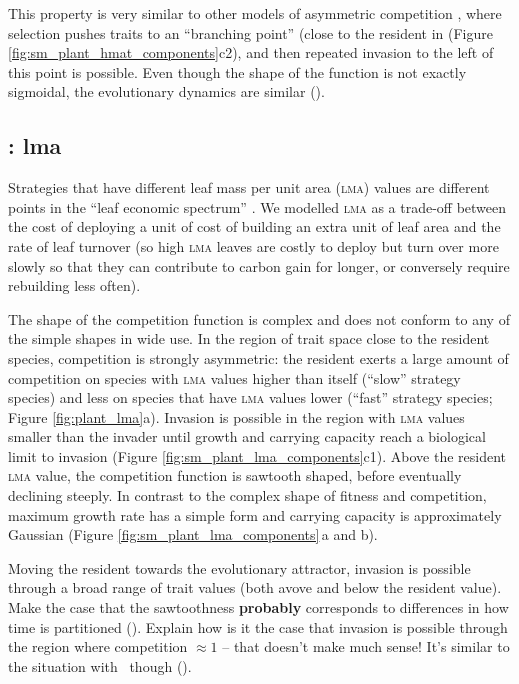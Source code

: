 \documentclass[a4paper,11pt]{article}
\begin{document}
This property is very similar to other models of asymmetric
competition \citep[e.g.,][]{Kisdi-1999}, where selection pushes traits
to an ``branching point'' (close to the resident in (Figure
\ref{fig:sm_plant_hmat_components}c2), and then repeated invasion to
the left of this point is possible.
Even though the shape of the function is not exactly sigmoidal, the
evolutionary dynamics are similar (\TODO).

\subsection{\plant: lma}
Strategies that have different leaf mass per unit area (\textsc{lma})
values are different points in the ``leaf economic spectrum''
\citep{Reich-1997,Wright-2004}.  We modelled \textsc{lma} as a trade-off
between the cost of deploying a unit of cost of building an extra unit
of leaf area and the rate of leaf turnover (so high \textsc{lma} leaves are
costly to deploy but turn over more slowly so that they can contribute
to carbon gain for longer, or conversely require rebuilding less
often).

The shape of the competition function is complex and does not conform
to any of the simple shapes in wide use.
In the region of trait space close to the resident species,
competition is strongly asymmetric: the resident exerts a large amount
of competition on species with \textsc{lma} values higher than itself (``slow''
strategy species) and less on species that have \textsc{lma} values lower
(``fast'' strategy species; Figure \ref{fig:plant_lma}a).  Invasion is
possible in the region with \textsc{lma} values smaller than the invader until
growth and carrying capacity reach a biological limit to invasion
(Figure \ref{fig:sm_plant_lma_components}c1).
%
Above the resident \textsc{lma} value, the competition function is sawtooth
shaped, before eventually declining steeply.
%
In contrast to the complex shape of fitness and competition, maximum
growth rate has a simple form and carrying capacity is approximately
Gaussian (Figure \ref{fig:sm_plant_lma_components}\,a and b).

Moving the resident towards the evolutionary attractor, invasion is
possible through a broad range of trait values (both avove and below
the resident value).
%
Make the case that the sawtoothness \textbf{probably} corresponds to
differences in how time is partitioned (\TODO).
%
Explain how is it the case that invasion is possible through the
region where competition $\approx 1$ -- that doesn't make much sense!
It's similar to the situation with \hmat\ though (\TODO).
\end{document}
